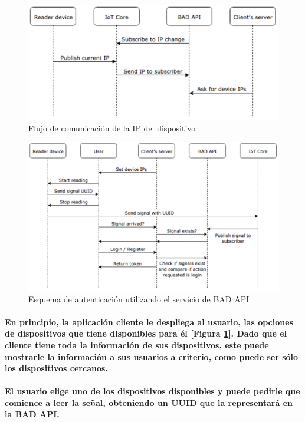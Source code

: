 \documentclass{article}
\begin{document}
\begin{figure}[ht]
    \centering
    \includegraphics[width=\textwidth]{ipexchange.png}%
    \caption{Flujo de comunicación de la IP del dispositivo}
    \label{fig:ipexchange}
\end{figure}

\begin{figure}[ht]
    \centering
    \includegraphics[width=\textwidth]{authschema.png}%
    \caption{Esquema de autenticación utilizando el servicio de BAD API}
    \label{fig:authschema}
\end{figure}

\paragraph{
En principio, la aplicación cliente le despliega al usuario, las opciones de dispositivos que tiene disponibles para él [Figura \ref{fig:ipexchange}]. Dado que el cliente tiene toda la información de sus dispositivos, este puede mostrarle la información a sus usuarios a criterio, como puede ser sólo los dispositivos cercanos.
}
\paragraph{
El usuario elige uno de los dispositivos disponibles y puede pedirle que comience a leer la señal, obteniendo un UUID que la representará en la BAD API.
}
\end{document}
